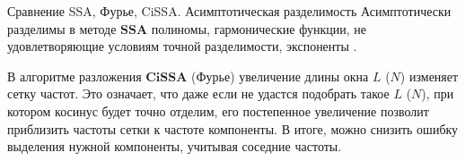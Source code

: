 \documentclass[notheorems, handout]{beamer}
\newtheorem{comment}{Замечание}
\newcommand{\SSA}{\textbf{SSA}}
\newcommand{\CISSA}{\textbf{CiSSA}}
\begin{document}
	

	\begin{frame}{Сравнение SSA, Фурье, CiSSA. Асимптотическая разделимость}
		Асимптотически разделимы в методе $\SSA$ полиномы, гармонические функции, не удовлетворяющие условиям точной разделимости, экспоненты \parencite{golyandina2001analysis}.

		В алгоритме разложения $\CISSA$ (Фурье) увеличение длины окна $L$ ($N$) изменяет сетку частот. Это означает, что даже если не удастся подобрать такое $L$ ($N$), при котором косинус будет точно отделим, его постепенное увеличение позволит приблизить частоты сетки к частоте компоненты. В итоге, можно снизить ошибку выделения нужной компоненты, учитывая соседние частоты.

	\end{frame}
	
\end{document}
